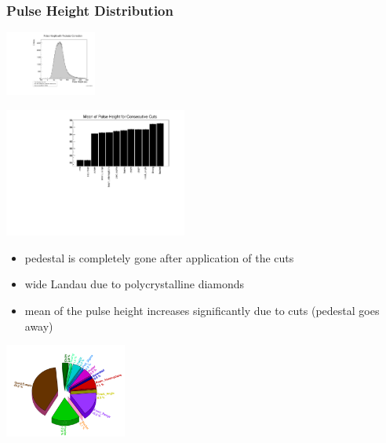 \documentclass[9pt]{beamer}
\begin{document}
\begin{frame}
	\frametitle{Pulse Height Distribution}
	\begin{minipage}{4cm}
		\centering 
		\includegraphics[angle=270, width=3.0cm]{Landau}
	\end{minipage}
	\hspace*{2pt}
	\begin{minipage}{6.5cm}
		\centering
		\includegraphics[angle=270, width=6.0cm]{CutMeans}
	\end{minipage}
	\begin{minipage}{6cm}
		\begin{itemize}
			\item pedestal is completely gone after application of the cuts 
			\item wide Landau due to polycrystalline diamonds
			\item mean of the pulse height increases significantly due to cuts (pedestal goes away)
		\end{itemize}
	\end{minipage}
	\hspace*{2pt}
	\begin{minipage}{5cm}
		\centering
		\includegraphics[width=4cm]{Cuts}
	\end{minipage}
\end{frame}
\end{document}
